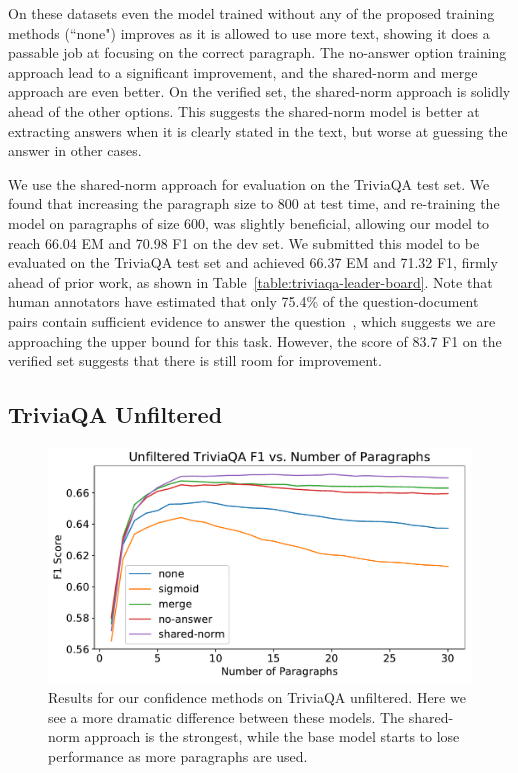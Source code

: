 \documentclass[11pt,a4paper]{article}
\begin{document}
On these datasets even the model trained without any of the proposed training methods (``none") improves as it is allowed to use more text, showing it does a passable job at focusing on the correct paragraph. The no-answer option training approach lead to a significant improvement, and the shared-norm and merge approach are even better. On the verified set, the shared-norm approach is solidly ahead of the other options. This suggests the shared-norm model is better at extracting answers when it is clearly stated in the text, but worse at guessing the answer in other cases. 

We use the shared-norm approach for evaluation on the TriviaQA test set. We found that increasing the paragraph size to 800 at test time, and re-training the model on paragraphs of size 600, was slightly beneficial, allowing our model to reach 66.04 EM and 70.98 F1 on the dev set. We submitted this model to be evaluated on the TriviaQA test set and achieved 66.37 EM and 71.32 F1, firmly ahead of prior work, as shown in Table~\ref{table:triviaqa-leader-board}. Note that human annotators have estimated that only 75.4\% of the question-document pairs contain sufficient evidence to answer the question~\cite{triviaqa}, which suggests we are approaching the upper bound for this task. However, the score of 83.7 F1 on the verified set suggests that there is still room for improvement.

\subsection{TriviaQA Unfiltered}

\begin{figure}[!ht]
\includegraphics[width=\columnwidth]{figures/open_ablate-eps-converted-to.pdf}
\caption{Results for our confidence methods on TriviaQA unfiltered. Here we see a more dramatic difference between these models. The shared-norm approach is the strongest, while the base model starts to lose performance as more paragraphs are used.}
\label{fig:open-results}
\end{figure}
\end{document}
